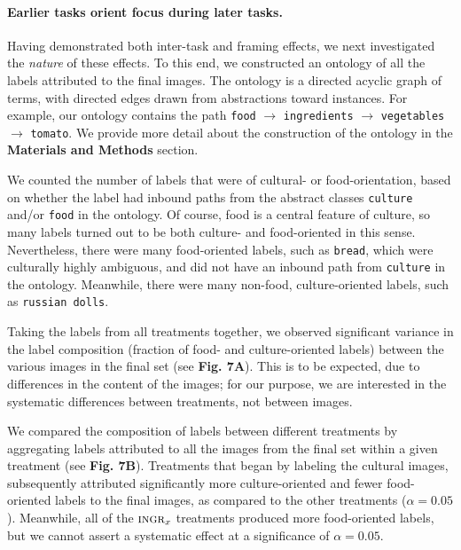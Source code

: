 \documentclass[a4paper]{report}
\begin{document}
\paragraph{Earlier tasks orient focus during later tasks.} Having 
demonstrated both inter-task and framing effects, we next
investigated the \textit{nature} of these effects.  To this
end, we constructed an ontology of all the labels attributed to
the final images.   
The ontology is a directed acyclic graph of terms,
with directed edges drawn from abstractions toward instances.  For example,
our ontology contains the path \texttt{food} $\to$ \texttt{ingredients} $\to$ 
\texttt{vegetables} 
$\to$ \texttt{tomato}. We provide more detail about the construction of the 
ontology in the \textbf{Materials and Methods} section.

We counted the number of labels that were of cultural- 
or food-orientation,
based on whether the label had inbound paths from the 
abstract classes \texttt{culture} and/or \texttt{food} in the ontology. Of 
course, food is a central feature of culture, so many labels turned out to be
both culture- and food-oriented in this sense.  Nevertheless, there were many 
food-oriented labels, such as \texttt{bread}, which were culturally highly 
ambiguous, and did not have an inbound path from \texttt{culture} in the 
ontology.  Meanwhile, there were many non-food, culture-oriented labels, such
as \texttt{russian dolls}. 


Taking the labels from all treatments together, we observed significant 
variance in the label composition (fraction of food- and culture-oriented 
labels) between the various 
images in the final set (see \textbf{Fig. 7A}).  This is to be expected, due 
to differences in the content of the images; for our purpose, we are 
interested in the systematic differences between treatments, not between 
images.

We compared the composition of labels between different treatments by
aggregating labels attributed to all the images from the final set within a 
given treatment (see \textbf{Fig. 7B}).  
Treatments that began by labeling the cultural images, 
subsequently attributed significantly more culture-oriented and fewer 
food-oriented labels to the final images, as compared to the other 
treatments ($\alpha=0.05$).  Meanwhile, all of the $\textsc{ingr}_x$ 
treatments produced more food-oriented labels, but we cannot assert a 
systematic effect at a significance of $\alpha = 0.05$. 
\end{document}
